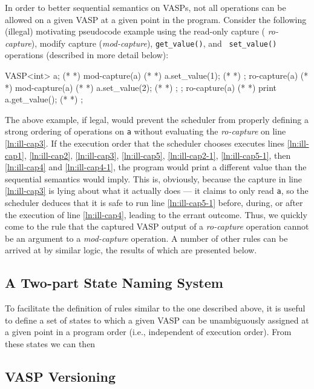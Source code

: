 In order to better sequential semantics on VASPs, not all operations can be
allowed on a given VASP at a given point in the program.  Consider the following
(illegal) motivating pseudocode example using the read-only capture ({\em
ro-capture}), modify capture ({\em mod-capture}), {\tt get\_value()}, and {\tt
set\_value()} operations (described in more detail below):
\begin{vaspPseudo}
VASP<int> a; (* \label{ln:ill-cap1} *)
mod-capture(a){  (* \label{ln:ill-cap2} *)
  a.set_value(1);  (* \label{ln:ill-cap2-1} *)
}; 
ro-capture(a){ (* \label{ln:ill-cap3} *)
  mod-capture(a){ (* \label{ln:ill-cap4} *)
    a.set_value(2); (* \label{ln:ill-cap4-1} *)
  }; 
};
ro-capture(a){ (* \label{ln:ill-cap5} *)
  print a.get_value(); (* \label{ln:ill-cap5-1} *)
}; 
\end{vaspPseudo}
The above example, if legal, would prevent the scheduler from properly defining
a strong ordering of operations on {\tt a} without evaluating the {\it
ro-capture} on line \ref{ln:ill-cap3}.  If the execution order that the
scheduler chooses executes lines \ref{ln:ill-cap1}, \ref{ln:ill-cap2},
\ref{ln:ill-cap3}, \ref{ln:ill-cap5}, \ref{ln:ill-cap2-1}, \ref{ln:ill-cap5-1},
then \ref{ln:ill-cap4} and \ref{ln:ill-cap4-1}, the program would print a
different value than the sequential semantics would imply.  This is, obviously,
because the capture in line \ref{ln:ill-cap3} is lying about what it actually
does --- it claims to only read {\tt a}, so the scheduler deduces that it is
safe to run line \ref{ln:ill-cap5-1} before, during, or after the execution of
line \ref{ln:ill-cap4}, leading to the errant outcome.  Thus, we quickly come to
the rule that the captured VASP output of a {\it ro-capture} operation cannot
be an argument to a {\it mod-capture} operation.  A number of other rules can be
arrived at by similar logic, the results of which are presented below.

\subsection{A Two-part State Naming System}

To facilitate the definition of rules similar to the one described above, it is
useful to define a set of states to which a given VASP can be unambiguously
assigned at a given point in a program order (i.e., independent of execution
order).  From these states we can then 

\subsection{VASP Versioning}


